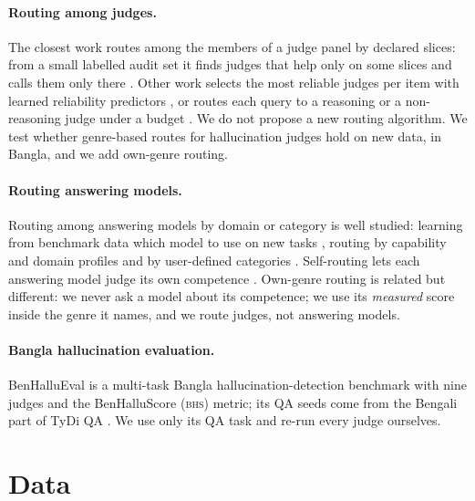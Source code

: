 \documentclass[11pt]{article}
\newcommand{\BHS}{\textsc{bhs}}
\begin{document}
\paragraph{Routing among judges.} The closest work routes among the members of a judge panel by declared slices: from
a small labelled audit set it finds judges that help only on some slices and calls them only there
\citep{judgepanels2026}. Other work selects the most reliable judges per item with learned reliability predictors
\citep{juryondemand2025}, or routes each query to a reasoning or a non-reasoning judge under a budget
\citep{racer2026}. We do not propose a new routing algorithm. We test whether genre-based routes for hallucination
judges hold on new data, in Bangla, and we add own-genre routing.

\paragraph{Routing answering models.} Routing among answering models by domain or category is well studied:
learning from benchmark data which model to use on new tasks \citep{shnitzer2023routing}, routing by capability and
domain profiles \citep{inferencedynamics2025} and by user-defined categories \citep{archrouter2025}. Self-routing lets
each answering model judge its own competence \citep{disrouter2025}. Own-genre routing is related but different: we
never ask a model about its competence; we use its \emph{measured} score inside the genre it names, and we route judges,
not answering models.

\paragraph{Bangla hallucination evaluation.} BenHalluEval \citep{benhallueval} is a multi-task Bangla
hallucination-detection benchmark with nine judges and the BenHalluScore (\BHS{}) metric; its QA seeds come from the
Bengali part of TyDi QA \citep{clark2020tydi}. We use only its QA task and re-run every judge ourselves.

\section{Data}\label{sec:data}
\end{document}
